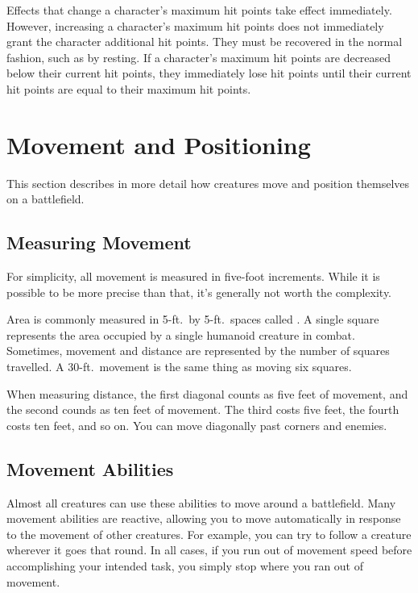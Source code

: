          Effects that change a character's maximum hit points take effect immediately.
        However, increasing a character's maximum hit points does not immediately grant the character additional hit points.
        They must be recovered in the normal fashion, such as by resting.
        If a character's maximum hit points are decreased below their current hit points, they immediately lose hit points until their current hit points are equal to their maximum hit points.

\section{Movement and Positioning}\label{Movement and Positioning}

    This section describes in more detail how creatures move and position themselves on a battlefield.

    \subsection{Measuring Movement}

        For simplicity, all movement is measured in five-foot increments.
        While it is possible to be more precise than that, it's generally not worth the complexity.

        \label{Squares} Area is commonly measured in 5-ft.\ by 5-ft.\ spaces called .
        A single square represents the area occupied by a single humanoid creature in combat.
        Sometimes, movement and distance are represented by the number of squares travelled.
        A 30-ft.\ movement is the same thing as moving six squares.

        \label{Diagonals} When measuring distance, the first diagonal counts as five feet of movement, and the second counds as ten feet of movement.
        The third costs five feet, the fourth costs ten feet, and so on.
        You can move diagonally past corners and enemies.

    \subsection{Movement Abilities}

        Almost all creatures can use these abilities to move around a battlefield.
        Many movement abilities are reactive, allowing you to move automatically in response to the movement of other creatures.
        For example, you can try to follow a creature wherever it goes that round.
        In all cases, if you run out of movement speed before accomplishing your intended task, you simply stop where you ran out of movement.

